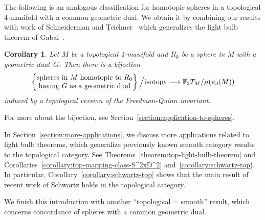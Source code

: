 \documentclass[11pt]{amsart}
\def\to{\mathchoice{\longrightarrow}{\rightarrow}{\rightarrow}{\rightarrow}}
\newtheorem{corollaryalpha}[theoremalpha]{Corollary}\def\thecorollaryalpha{\Alph{corollaryalpha}}
\theoremstyle{definition}
\theoremstyle{theorem-giventitle}
\theoremstyle{definition-giventitle}
\numberwithin{equation}{section}
\def\bF{{\mathbb{F}}}
\begin{document}
The following is an analogous classification for homotopic spheres in a topological 4-manifold with a common geometric dual.
We obtain it by combining our results with work of Schneiderman and Teichner~\cite{Schneiderman-Teichner:2022-1} which generalizes the light bulb theorem of Gabai~\cite{Gabai:2020-1}.

\begin{corollaryalpha}
  \label{corollary:sphere-top-isotopy-classification}
  Let $M$ be a topological 4-manifold and $R_0$ be a sphere in $M$ with a geometric dual~$G$.
  Then there is a bijection
  \[
    \left\{\begin{tabular}{@{}c@{}}
      spheres in $M$ homotopic to $R_0$\\
      having $G$ as a geometric dual
    \end{tabular}\right\}
    \Big/
    \text{isotopy}
    \to
    \bF_2 T_M / \mu(\pi_3(M))
  \]
  induced by a topological version of the Freedman-Quinn invariant.
\end{corollaryalpha}

For more about the bijection, see Section~\ref{section:application-to-spheres}.

In Section~\ref{section:more-applications}, we discuss more applications related to light bulb theorems, which generalize previously known smooth category results to the topological category.
See Theorems~\ref{theorem:top-light-bulb-theorem} and Corollaries~\ref{corollary:top-mapping-class-S^2xD^2} and~\ref{corollary:schwartz-top}.
In particular, Corollary~\ref{corollary:schwartz-top} shows that the main result of recent work of Schwartz \cite[Theorem~0.1]{Schwartz:2021-1} holds in the topological category.

We finish this introduction with another ``topological = smooth'' result, which concerns concordance of spheres with a common geometric dual.
\end{document}
